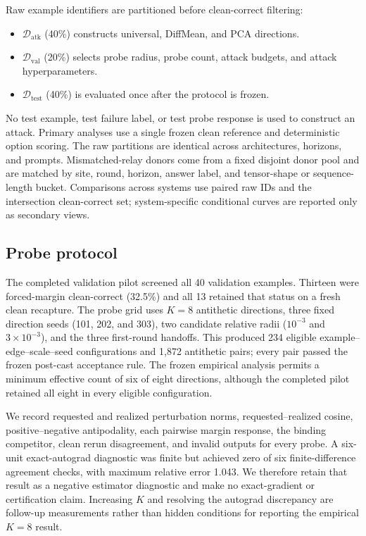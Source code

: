 \documentclass[11pt]{article}
\begin{document}
Raw example identifiers are partitioned before clean-correct filtering:
\begin{itemize}
    \item $\mathcal D_{\mathrm{atk}}$ (40\%) constructs universal, DiffMean,
    and PCA directions.
    \item $\mathcal D_{\mathrm{val}}$ (20\%) selects probe radius, probe count,
    attack budgets, and attack hyperparameters.
    \item $\mathcal D_{\mathrm{test}}$ (40\%) is evaluated once after the
    protocol is frozen.
\end{itemize}
No test example, test failure label, or test probe response is used to construct
an attack. Primary analyses use a single frozen clean reference and deterministic
option scoring. The raw partitions are identical across architectures, horizons,
and prompts. Mismatched-relay donors come from a fixed disjoint donor pool and
are matched by site, round, horizon, answer label, and tensor-shape or sequence-
length bucket. Comparisons across systems use paired raw IDs and the
intersection clean-correct set; system-specific conditional curves are reported
only as secondary views.

\subsection{Probe protocol}

The completed validation pilot screened all 40 validation examples. Thirteen
were forced-margin clean-correct (32.5\%) and all 13 retained that status on a
fresh clean recapture. The probe grid uses $K=8$ antithetic directions, three
fixed direction seeds (101, 202, and 303), two candidate relative radii
($10^{-3}$ and $3\times10^{-3}$), and the three first-round handoffs. This
produced 234 eligible example--edge--scale--seed configurations and 1,872
antithetic pairs; every pair passed the frozen post-cast acceptance rule. The
frozen empirical analysis permits a minimum effective count of six of eight
directions, although the completed pilot retained all eight in every eligible
configuration.

We record requested and realized perturbation norms, requested--realized
cosine, positive--negative antipodality, each pairwise margin response, the
binding competitor, clean rerun disagreement, and invalid outputs for every
probe. A six-unit exact-autograd diagnostic was finite but achieved zero of six
finite-difference agreement checks, with maximum relative error 1.043. We
therefore retain that result as a negative estimator diagnostic and make no
exact-gradient or certification claim. Increasing $K$ and resolving the
autograd discrepancy are follow-up measurements rather than hidden conditions
for reporting the empirical $K=8$ result.
\end{document}
